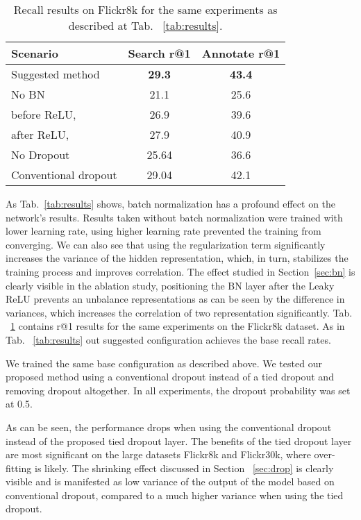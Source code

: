\documentclass[10pt,twocolumn,letterpaper]{article}
\begin{document}
\begin{table}[t]
\centering
    \begin{tabular}{|l|c|c|}
    \hline
    Scenario & Search r@1  & Annotate r@1 \\
    \hline
    Suggested method  & \textbf{29.3} & \textbf{43.4}\\
    \hline
    No BN  & 21.1 & 25.6\\
    before ReLU,  & 26.9 & 39.6\\
    after ReLU,  & 27.9 & 40.9\\
    \hline
    No Dropout & 25.64 & 36.6\\
    Conventional dropout & 29.04 & 42.1\\
    \hline
     \end{tabular}
     \caption{Recall results on Flickr8k for the same experiments as described at Tab. ~\ref{tab:results}.}
\label{tab:results_recall}\end{table}

As Tab.~\ref{tab:results} shows, batch normalization has a profound effect on the network's results. Results taken without batch normalization were trained with lower learning rate, using higher learning rate prevented the training from converging. We can also see that using the  regularization term significantly increases the variance of the hidden representation, which, in turn, stabilizes the training process and improves correlation. The effect studied in Section~\ref{sec:bn} is clearly visible in the ablation study, positioning the BN layer after the Leaky ReLU prevents an unbalance representations as can be seen by the difference in variances, which increases the correlation of two representation significantly. Tab. ~\ref{tab:results_recall} contains r@1 results for the same experiments on the Flickr8k dataset. As in Tab. ~\ref{tab:results} out suggested configuration achieves the base recall rates.   

We trained the same base configuration as described above. We tested our proposed method using a conventional dropout instead of a tied dropout and removing dropout altogether.
In all experiments, the dropout probability  was set at 0.5.

As can be seen, the performance drops when using the conventional dropout instead of the proposed tied dropout layer. The benefits of the tied dropout layer are most significant on the large datasets Flickr8k and Flickr30k, where over-fitting is likely. The shrinking effect discussed in Section ~\ref{sec:drop} is clearly visible and is manifested as low variance of the output of the model based on conventional dropout, compared to a much higher variance when using the tied dropout.   
\end{document}
